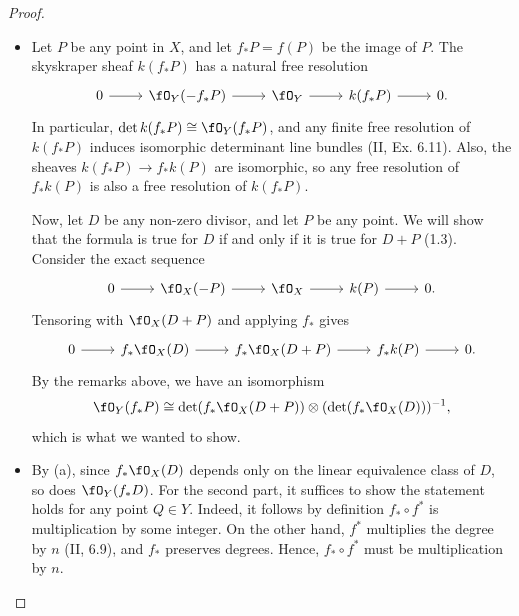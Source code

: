 \documentclass[a4paper]{article}
\begin{document}
\begin{enumerate} [label=\textbf{\arabic*.}, leftmargin=0em]
        \begin{proof} $ $ \vspace{0pt}
          \begin{itemize} [leftmargin=0cm]
            \item[(a)] Let $P$ be any point in $X$, and let $f_*P = f(P)$ be the image of $P$.
                  The skyskraper sheaf $k(f_*P)$ has a natural free resolution
                  \[ \begin{tikzcd}
                      0 \arrow[r] & \fO_Y(-f_*P) \arrow[r] & \fO_Y \arrow[r] & k(f_*P) \arrow[r] & 0.
                    \end{tikzcd} \]
                  In particular, $\det k(f_*P) \cong \fO_Y(f_*P)$, and any finite free resolution of $k(f_*P)$ induces isomorphic determinant line bundles (II, Ex. 6.11).
                  Also, the sheaves $k(f_*P) \to f_*k(P)$ are isomorphic, so any free resolution of $f_*k(P)$ is also a free resolution of $k(f_*P)$.

                  Now, let $D$ be any non-zero divisor, and let $P$ be any point.
                  We will show that the formula is true for $D$ if and only if it is true for $D + P$ (1.3).
                  Consider the exact sequence
                  \[ \begin{tikzcd}
                      0 \arrow[r] & \fO_X(-P) \arrow[r] & \fO_X \arrow[r] & k(P) \arrow[r] & 0.
                    \end{tikzcd} \]
                  Tensoring with $\fO_X(D + P)$ and applying $f_*$ gives
                  \[ \begin{tikzcd}
                      0 \arrow[r] & f_*\fO_X(D) \arrow[r] & f_*\fO_X(D + P) \arrow[r] & f_*k(P) \arrow[r] & 0.
                    \end{tikzcd} \]
                  By the remarks above, we have an isomorphism
                  \begin{equation*}
                    \fO_Y(f_*P) \cong \det(f_*\fO_X(D+P)) \otimes (\det(f_*\fO_X(D)))^{-1},
                  \end{equation*}
                  which is what we wanted to show.

            \item[(b)] By (a), since $f_*\fO_X(D)$ depends only on the linear equivalence class of $D$, so does $\fO_Y(f_*D)$.
                  For the second part, it suffices to show the statement holds for any point $Q \in Y$.
                  Indeed, it follows by definition $f_* \circ f^*$ is multiplication by some integer.
                  On the other hand, $f^*$ multiplies the degree by $n$ (II, 6.9), and $f_*$ preserves degrees.
                  Hence, $f_* \circ f^*$ must be multiplication by $n$.


\end{itemize}
\end{proof}
\end{enumerate}
\end{document}

